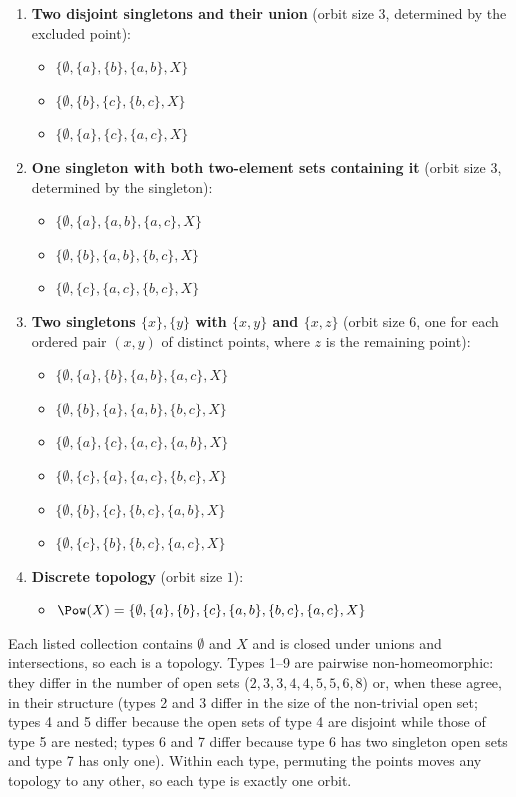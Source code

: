 \begin{enumerate}
  \item \textbf{Two disjoint singletons and their union} (orbit size $3$, determined by the
  excluded point):
  \begin{itemize}
    \item $\{\emptyset,\{a\},\{b\},\{a,b\},X\}$
    \item $\{\emptyset,\{b\},\{c\},\{b,c\},X\}$
    \item $\{\emptyset,\{a\},\{c\},\{a,c\},X\}$
  \end{itemize}

  \item \textbf{One singleton with both two-element sets containing it} (orbit size $3$,
  determined by the singleton):
  \begin{itemize}
    \item $\{\emptyset,\{a\},\{a,b\},\{a,c\},X\}$
    \item $\{\emptyset,\{b\},\{a,b\},\{b,c\},X\}$
    \item $\{\emptyset,\{c\},\{a,c\},\{b,c\},X\}$
  \end{itemize}

  \item \textbf{Two singletons $\{x\},\{y\}$ with $\{x,y\}$ and $\{x,z\}$} (orbit size $6$, one
  for each ordered pair $(x,y)$ of distinct points, where $z$ is the remaining point):
  \begin{itemize}
    \item $\{\emptyset,\{a\},\{b\},\{a,b\},\{a,c\},X\}$
    \item $\{\emptyset,\{b\},\{a\},\{a,b\},\{b,c\},X\}$
    \item $\{\emptyset,\{a\},\{c\},\{a,c\},\{a,b\},X\}$
    \item $\{\emptyset,\{c\},\{a\},\{a,c\},\{b,c\},X\}$
    \item $\{\emptyset,\{b\},\{c\},\{b,c\},\{a,b\},X\}$
    \item $\{\emptyset,\{c\},\{b\},\{b,c\},\{a,c\},X\}$
  \end{itemize}

  \item \textbf{Discrete topology} (orbit size $1$):
  \begin{itemize}
    \item $\Pow(X)=\{\emptyset,\{a\},\{b\},\{c\},\{a,b\},\{b,c\},\{a,c\},X\}$
  \end{itemize}
\end{enumerate}

Each listed collection contains $\emptyset$ and $X$ and is closed under unions and
intersections, so each is a topology. Types 1--9 are pairwise non-homeomorphic: they differ in
the number of open sets ($2,3,3,4,4,5,5,6,8$) or, when these agree, in their structure (types 2
and 3 differ in the size of the non-trivial open set; types 4 and 5 differ because the open sets
of type 4 are disjoint while those of type 5 are nested; types 6 and 7 differ because type 6 has
two singleton open sets and type 7 has only one). Within each type, permuting the points moves
any topology to any other, so each type is exactly one orbit.

